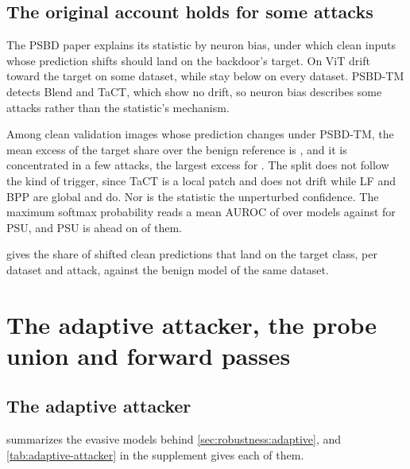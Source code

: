 \subsection{The original account holds for some attacks}
\label{app:shift-target}\label{sec:mechanism:phenomenon}

The PSBD paper explains its statistic by neuron bias, under which clean inputs whose prediction shifts should land on the backdoor's target. On ViT \ShiftToTargetDriftAttacks{} drift toward the target on some dataset, while \ShiftToTargetNoDriftAttacks{} stay below \ShiftToTargetNoDriftFloor{} on every dataset. PSBD-TM detects Blend and TaCT, which show no drift, so neuron bias describes some attacks rather than the statistic's mechanism.

Among clean validation images whose prediction changes under PSBD-TM, the mean excess of the target share over the benign reference is \ShiftToTargetExcessAll{}, and it is concentrated in a few attacks, the largest excess \ShiftToTargetLargestExcess{} for \ShiftToTargetLargestCell{}. The split does not follow the kind of trigger, since TaCT is a local patch and does not drift while LF and BPP are global and do. Nor is the statistic the unperturbed confidence. The maximum softmax probability reads a mean AUROC of \ConfidenceNullAuroc{} over \ConfidenceNullCheckpoints{} models against \ConfidenceNullPsuAuroc{} for PSU, and PSU is ahead on \ConfidenceNullPsuWins{} of them.

 gives the share of shifted clean predictions that land on the target class, per dataset and attack, against the benign model of the same dataset.



\FloatBarrier


\section{The adaptive attacker, the probe union and forward passes}
\label{app:robustness-group}

\subsection{The adaptive attacker}
\label{app:adaptive}

 summarizes the evasive models behind \cref{sec:robustness:adaptive}, and \cref{tab:adaptive-attacker} in the supplement gives each of them.

